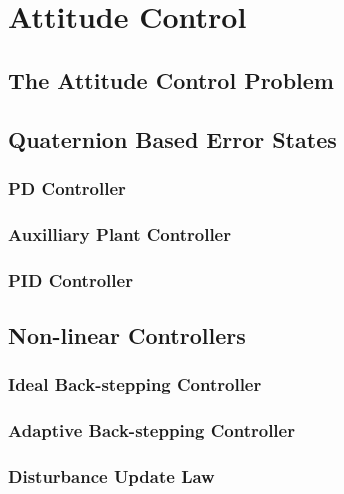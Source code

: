 \section{Attitude Control}
\label{sec:control.attitude}
\subsection{The Attitude Control Problem}
\label{subsec:control.attitude.problem}
\subsection{Quaternion Based Error States}
\label{subsec:control.attitude.quaternion}
\subsubsection{PD Controller}
\subsubsection{Auxilliary Plant Controller}
\subsubsection{PID Controller}
\subsection{Non-linear Controllers}
\label{subsec:control.attitude.nonlinear}
\subsubsection{Ideal Back-stepping Controller}
\subsubsection{Adaptive Back-stepping Controller}
\label{subsubsec:control.attitude.nonlinear.backstep}
\subsubsection*{Disturbance Update Law}
